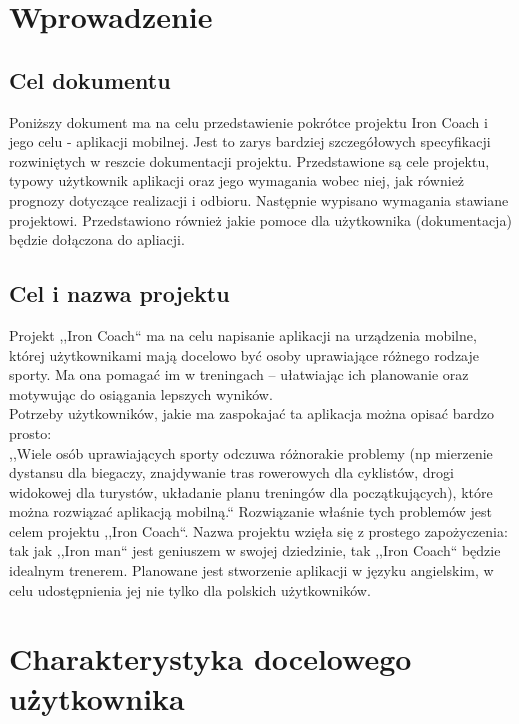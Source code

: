 

\tableofcontents
\clearpage
\section{Wprowadzenie}
\subsection{Cel dokumentu}
Poniższy dokument ma na celu przedstawienie pokrótce projektu Iron Coach i jego celu - aplikacji mobilnej. Jest to zarys bardziej szczegółowych specyfikacji rozwiniętych w reszcie dokumentacji projektu. Przedstawione są cele projektu, typowy użytkownik aplikacji oraz jego wymagania wobec niej, jak również prognozy dotyczące realizacji i odbioru. Następnie wypisano wymagania stawiane projektowi. Przedstawiono również jakie pomoce dla użytkownika (dokumentacja) będzie dołączona do apliacji.
\subsection{Cel i nazwa projektu}
Projekt ,,Iron Coach`` ma na celu napisanie aplikacji na urządzenia mobilne, której użytkownikami mają docelowo być osoby uprawiające różnego rodzaje sporty. Ma ona pomagać im w treningach -- ułatwiając ich planowanie oraz motywując do osiągania lepszych wyników. \\
Potrzeby użytkowników, jakie ma zaspokajać ta aplikacja można opisać bardzo prosto:\\ 
,,Wiele osób uprawiających sporty odczuwa różnorakie problemy (np mierzenie dystansu dla biegaczy, znajdywanie tras rowerowych dla cyklistów, drogi widokowej dla turystów, układanie planu treningów dla początkujących), które można rozwiązać aplikacją mobilną.``
Rozwiązanie właśnie tych problemów jest celem projektu ,,Iron Coach``. 
Nazwa projektu wzięła się z prostego zapożyczenia: tak jak ,,Iron man`` jest geniuszem w swojej dziedzinie, tak ,,Iron Coach`` będzie idealnym trenerem. Planowane jest stworzenie aplikacji w języku angielskim, w celu udostępnienia jej nie tylko dla polskich użytkowników.
\section{Charakterystyka docelowego użytkownika}
